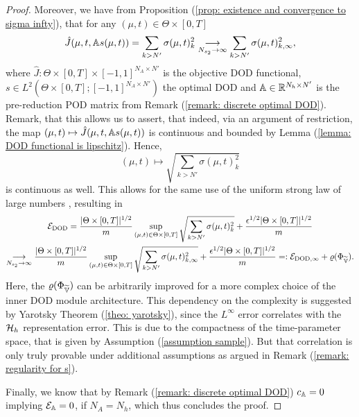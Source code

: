 \begin{proof}
    Moreover, we have from Proposition (\ref{prop: existence and convergence to sigma infty}), that 
    for any $(\mu, t) \in \Theta \times [0, T]$
    \begin{equation*}
        \hat J(\mu, t, \mathbb{A} s(\mu, t)) = \sum_{k > N'} \sigma(\mu, t)_k^2 \underset{N_{s_2} \to \infty}{\longrightarrow} \sum_{k > N'}  
        \sigma(\mu, t)_{k, \infty}^2,
    \end{equation*}
    where $\hat J: \Theta \times [0, T] \times [-1, 1]^{N_A \times N'}$ is the objective DOD functional, 
    $s \in L^2(\Theta \times [0, T]; [-1, 1]^{N_A \times N'})$ the
    optimal DOD and $\mathbb{A} \in \mathbb{R}^{N_h \times N'}$ is the pre-reduction POD matrix from
    Remark (\ref{remark: discrete optimal DOD}). Remark, that this allows us to assert, that indeed, via
    an argument of restriction, 
    the map $(\mu, t) \mapsto \hat J(\mu, t, \mathbb{A} s(\mu, t))$ is continuous 
    and bounded by Lemma (\ref{lemma: DOD functional is lipschitz}).
    Hence,
    \begin{equation*}
        (\mu, t) \mapsto \sqrt{\sum_{k>N'} \sigma(\mu, t)_k^2}
    \end{equation*}
    is continuous as well. This allows for the same use of the uniform strong law of large numbers
    \cite{newey1994}, resulting in
    \begin{multline*}
        \mathcal{E}_\text{DOD} = \frac{\lvert \Theta \times [0, T] \rvert^{1/2}}{m}
        \sup\limits_{(\mu, t) \in \Theta \times [0, T]} \sqrt{\sum_{k > N'} \sigma(\mu, t)_{k}^2}
        + \frac{\epsilon^{1/2} \lvert \Theta \times [0, T] \rvert^{1/2}}{m}
        \\
        \underset{N_{s_2} \to \infty}{\longrightarrow} 
        \frac{\lvert \Theta \times [0, T] \rvert^{1/2}}{m}
        \sup\limits_{(\mu, t) \in \Theta \times [0, T]} \sqrt{\sum_{k > N'} \sigma(\mu, t)_{k, \infty}^2}
        + \frac{\epsilon^{1/2} \lvert \Theta \times [0, T] \rvert^{1/2}}{m}
        =: \mathcal{E}_{\text{DOD}, \infty} + \varrho(\Phi_{\widetilde{\mathbb{V}}}).
    \end{multline*}
    Here, the $\varrho(\Phi_{\widetilde{\mathbb{V}}})$ can be arbitrarily improved for a more complex choice of the 
    inner DOD module architecture. This dependency
    on the complexity is suggested by Yarotsky Theorem (\ref{theo: yarotsky}), since the $L^\infty$ error 
    correlates with the 
    $\mathcal{H}_h$ representation error. This is due to the compactness of the time-parameter space, that is given
    by Assumption (\ref{assumption sample}). But that correlation is only truly
    provable under additional assumptions as argued in 
    Remark (\ref{remark: regularity for s}).

    Finally, we know that by Remark (\ref{remark: discrete optimal DOD}) $c_{\mathbb{A}} = 0$ implying 
    $\mathcal{E}_{\mathbb{A}} = 0$, if $N_A = N_h$, which thus
    concludes the proof.
\end{proof}


